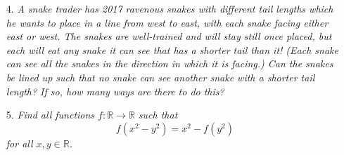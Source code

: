 \documentclass[12pt]{article}
\begin{document}
\begin{enumerate}
\item[4.] \emph{A snake trader has 2017 ravenous snakes with different tail lengths which he wants to place in a line from west to east, with each snake facing either east or west. The snakes are well-trained and will stay still once placed, but each will eat any snake it can see that has a shorter tail than it! (Each snake can see all the snakes in the direction in which it is facing.) Can the snakes be lined up such that no snake can see another snake with a shorter tail length? If so, how many ways are there to do this?}



\item[5.] \emph{Find all functions $f : \mathbb{R} \to \mathbb{R}$ such that
	\[f(x^2-y^2) = x^2 - f(y^2)\]
for all $x,y \in \mathbb{R}$.}



\end{enumerate}
\end{document}
